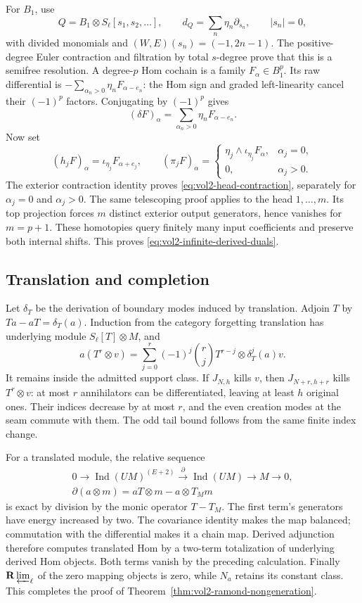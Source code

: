 For \(B_1\), use
\[
 Q=B_1\otimes S_\ell[s_1,s_2,\ldots],\qquad
 d_Q=\sum_n\eta_n\partial_{s_n},\qquad |s_n|=0,
\]
with divided monomials and
\((W,E)(s_n)=(-1,2n-1)\). The positive-degree Euler contraction
and filtration by total \(s\)-degree prove that this is a
semifree resolution. A degree-\(p\) Hom cochain is a family
\(F_\alpha\in B_1^p\). Its raw differential is
\(-\sum_{\alpha_n>0}\eta_nF_{\alpha-e_n}\):
the Hom sign and graded left-linearity cancel their
\((-1)^p\) factors. Conjugating by \((-1)^p\) gives
\[
 (\delta F)_\alpha
       =\sum_{\alpha_n>0}\eta_nF_{\alpha-e_n}.
\]
Now set
\[
 (h_jF)_\alpha=\iota_{\eta_j}F_{\alpha+e_j},\qquad
 (\pi_jF)_\alpha=
 \begin{cases}
 \eta_j\wedge\iota_{\eta_j}F_\alpha,&\alpha_j=0,\\
 0,&\alpha_j>0.
 \end{cases}
\]
The exterior contraction identity proves
\eqref{eq:vol2-head-contraction}, separately for
\(\alpha_j=0\) and \(\alpha_j>0\).
The same telescoping proof applies to the head \(1,\ldots,m\).
Its top projection forces \(m\) distinct exterior output
generators, hence vanishes for \(m=p+1\). These homotopies
query finitely many input coefficients and preserve both
internal shifts. This proves
\eqref{eq:vol2-infinite-derived-duals}.

\subsection{Translation and completion}

Let \(\delta_T\) be the derivation of boundary modes induced
by translation. Adjoin \(T\) by \(Ta-aT=\delta_T(a)\).
Induction from the category forgetting translation has
underlying module \(S_\ell[T]\otimes M\), and
\[
 a(T^r\otimes v)=
 \sum_{j=0}^r(-1)^j\binom rj
 T^{r-j}\otimes\delta_T^j(a)v.
\]
It remains inside the admitted support class. If
\(J_{N,h}\) kills \(v\), then \(J_{N+r,h+r}\) kills
\(T^r\otimes v\): at most \(r\) annihilators can be
differentiated, leaving at least \(h\) original ones.
Their indices decrease by at most \(r\), and the even creation
modes at the seam commute with them. The odd tail bound
follows from the same finite index change.

For a translated module, the relative sequence
\[
 \begin{gathered}
 0\longrightarrow\operatorname{Ind}(UM)^{(E+2)}
 \xrightarrow{\ \partial\ }\operatorname{Ind}(UM)
 \longrightarrow M\longrightarrow0,\\
 \partial(a\otimes m)=aT\otimes m-a\otimes T_Mm
 \end{gathered}
\]
is exact by division by the monic operator \(T-T_M\).
The first term's generators have energy increased by two.
The covariance identity makes the map balanced; commutation
with the differential makes it a chain map.
Derived adjunction therefore computes translated Hom by a
two-term totalization of underlying derived Hom objects.
Both terms vanish by the preceding calculation. Finally
\(\mathbf R\varprojlim_\ell\) of the zero mapping objects
is zero, while \(N_a\) retains its constant class.
This completes the proof of
Theorem~\ref{thm:vol2-ramond-nongeneration}.

